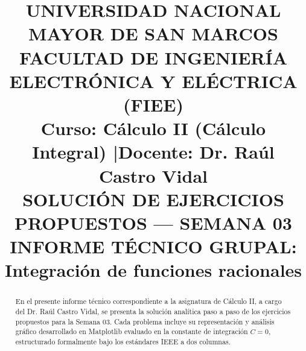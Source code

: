 \documentclass[conference]{IEEEtran}
\newcommand{\NumeroSemana}{03}
\newcommand{\TemaSemana}{Integración de funciones racionales}
\begin{document}
	
	\title{UNIVERSIDAD NACIONAL MAYOR DE SAN MARCOS\\
		\Large FACULTAD DE INGENIERÍA ELECTRÓNICA Y ELÉCTRICA (FIEE)\\
		\vspace{0.3cm}
		\large \textbf{Curso:} Cálculo II (Cálculo Integral) \quad|\quad \textbf{Docente:} Dr. Raúl Castro Vidal\\
		\vspace{0.4cm}
		\huge SOLUCIÓN DE EJERCICIOS PROPUESTOS --- SEMANA \NumeroSemana\\
		\LARGE INFORME TÉCNICO GRUPAL: \TemaSemana}
	
\author{
	\and
	\and
	\vspace{0.4cm}
	\and
	\and
	\and
}

\maketitle
	
	\begin{abstract}
		En el presente informe técnico correspondiente a la asignatura de Cálculo II, a cargo del Dr. Raúl Castro Vidal, se presenta la solución analítica paso a paso de los ejercicios propuestos para la Semana \NumeroSemana. Cada problema incluye su representación y análisis gráfico desarrollado en Matplotlib evaluado en la constante de integración $C=0$, estructurado formalmente bajo los estándares IEEE a dos columnas.
	\end{abstract}
	
\end{document}
